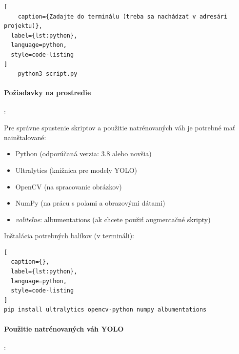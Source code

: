 \begin{lstlisting}[
    caption={Zadajte do terminálu (treba sa nachádzať v adresári projektu)},
  label={lst:python},
  language=python,
  style=code-listing
]
    python3 script.py
\end{lstlisting}

\paragraph{Požiadavky na prostredie}:

Pre správne spustenie skriptov a použitie natrénovaných váh je potrebné mať nainštalované:

\begin{itemize}
    \item Python (odporúčaná verzia: 3.8 alebo novšia)
    \item Ultralytics (knižnica pre modely YOLO)
    \item OpenCV (na spracovanie obrázkov)
    \item NumPy (na prácu s poľami a obrazovými dátami)
    \item \textit{voliteľne}: albumentations (ak chcete použiť augmentačné skripty)
\end{itemize}
Inštalácia potrebných balíkov (v termináli):
\begin{lstlisting}[
  caption={},
  label={lst:python},
  language=python,
  style=code-listing
]
pip install ultralytics opencv-python numpy albumentations

\end{lstlisting}

\paragraph{Použitie natrénovaných váh YOLO}:

